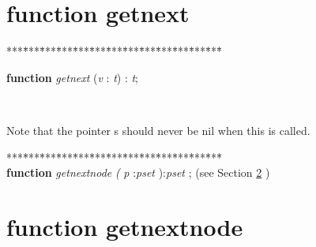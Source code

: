 \documentclass[10pt, a4paper]{article}
\begin{document}
\section{function getnext}\label{sec:genericset/pointer2pset/setle/setge/setequals/setdifference/rec/setsymetricdifference/setintersection/rec/setunion/rec/isemptyset/emptyset/newset/find/isin/getlast/getright/getfirst/getleftgetnext}

\begin{tabbing}
***\=***\=***\=***\=***\=***\=***\=***\=***\=***\=***\=***\=***\=\kill
\parbox{14cm}{\textsf {\textbf {function } \textsf{\textit{getnext} (\textit{v} : \textit{t}) : \textit{t}}; }}\\
\end{tabbing}
\textrm{Note that the pointer s should never be nil when this is called.} 
\begin{tabbing}
***\=***\=***\=***\=***\=***\=***\=***\=***\=***\=***\=***\=***\=\kill
\\
\+\textsf{\textbf{function}  \textit{getnextnode} \textit{(} \textit{p} :\textit{pset} ):\textit{pset} ;} (see Section \ref{sec:genericset/pointer2pset/setle/setge/setequals/setdifference/rec/setsymetricdifference/setintersection/rec/setunion/rec/isemptyset/emptyset/newset/find/isin/getlast/getright/getfirst/getleft/getnextgetnextnode} )\\
\end{tabbing}
\section{function getnextnode}\label{sec:genericset/pointer2pset/setle/setge/setequals/setdifference/rec/setsymetricdifference/setintersection/rec/setunion/rec/isemptyset/emptyset/newset/find/isin/getlast/getright/getfirst/getleft/getnextgetnextnode}
\end{document}
